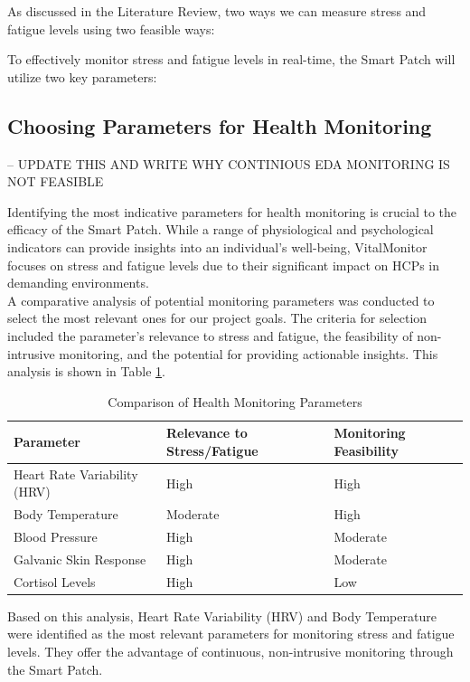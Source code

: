 As discussed in the Literature Review, two ways we can measure stress and fatigue levels using two feasible ways: 

To effectively monitor stress and fatigue levels in real-time, the Smart Patch will utilize two key parameters:\\

\subsection{Choosing Parameters for Health Monitoring} -- UPDATE THIS AND WRITE WHY CONTINIOUS EDA MONITORING IS NOT FEASIBLE

Identifying the most indicative parameters for health monitoring is crucial to the efficacy of the Smart Patch. While a range of physiological and psychological indicators can provide insights into an individual's well-being, VitalMonitor focuses on stress and fatigue levels due to their significant impact on HCPs in demanding environments.\cite{43} \cite{42}\\

A comparative analysis of potential monitoring parameters was conducted to select the most relevant ones for our project goals. The criteria for selection included the parameter’s relevance to stress and fatigue, the feasibility of non-intrusive monitoring, and the potential for providing actionable insights. This analysis is shown in Table \ref{tab:health_parameters}.\\

\begin{table}[h]
\centering 
\begin{tabularx}{\textwidth}{|X|X|X|}
\hline \textbf{Parameter} & \textbf{Relevance to Stress/Fatigue} & \textbf{Monitoring Feasibility} \\ 
\hline Heart Rate Variability (HRV) & High & High \\ 
\hline Body Temperature & Moderate & High \\
\hline Blood Pressure & High & Moderate \\ 
\hline Galvanic Skin Response & High & Moderate \\ 
\hline Cortisol Levels & High & Low \\  \hline
\end{tabularx} 
\caption{Comparison of Health Monitoring Parameters} \label{tab:health_parameters} 
\end{table}

\noindent Based on this analysis, Heart Rate Variability (HRV) and Body Temperature were identified as the most relevant parameters for monitoring stress and fatigue levels. They offer the advantage of continuous, non-intrusive monitoring through the Smart Patch.\\

